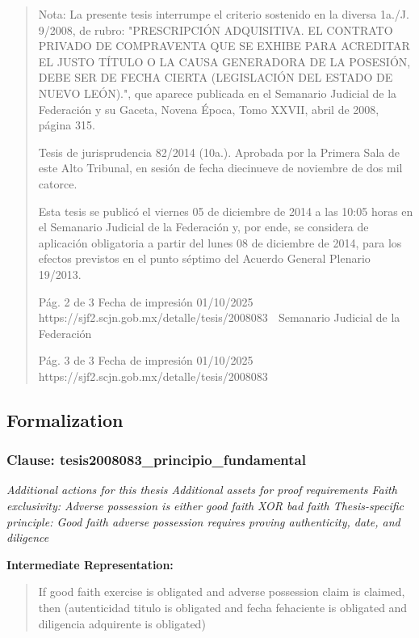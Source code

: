 \documentclass[11pt,a4paper]{article}
\begin{document}
\begin{quote}
Nota: La presente tesis interrumpe el criterio sostenido en la diversa 1a./J. 9/2008, de rubro:
"PRESCRIPCIÓN ADQUISITIVA. EL CONTRATO PRIVADO DE COMPRAVENTA QUE SE
EXHIBE PARA ACREDITAR EL JUSTO TÍTULO O LA CAUSA GENERADORA DE LA POSESIÓN,
DEBE SER DE FECHA CIERTA (LEGISLACIÓN DEL ESTADO DE NUEVO LEÓN).", que aparece
publicada en el Semanario Judicial de la Federación y su Gaceta, Novena Época, Tomo XXVII, abril
de 2008, página 315.

Tesis de jurisprudencia 82/2014 (10a.). Aprobada por la Primera Sala de este Alto Tribunal, en
sesión de fecha diecinueve de noviembre de dos mil catorce.


Esta tesis se publicó el viernes 05 de diciembre de 2014 a las 10:05 horas en el Semanario Judicial
de la Federación y, por ende, se considera de aplicación obligatoria a partir del lunes 08 de
diciembre de 2014, para los efectos previstos en el punto séptimo del Acuerdo General Plenario
19/2013.




                                              Pág. 2 de 3            Fecha de impresión 01/10/2025
  https://sjf2.scjn.gob.mx/detalle/tesis/2008083
                                                 Semanario Judicial de la Federación




                                            Pág. 3 de 3       Fecha de impresión 01/10/2025
https://sjf2.scjn.gob.mx/detalle/tesis/2008083

\end{quote}

\subsection{Formalization}

\subsubsection{Clause: tesis2008083\_principio\_fundamental}

\textit{Additional actions for this thesis Additional assets for proof requirements Faith exclusivity: Adverse possession is either good faith XOR bad faith Thesis-specific principle: Good faith adverse possession requires proving authenticity, date, and diligence}

\textbf{Intermediate Representation:}

\begin{quote}
If good faith exercise is obligated and adverse possession claim is claimed, then (autenticidad titulo is obligated and fecha fehaciente is obligated and diligencia adquirente is obligated)
\end{quote}
\end{document}
